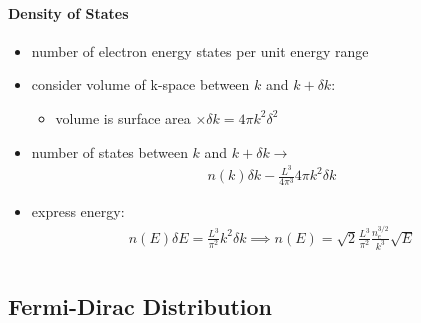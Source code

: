 \documentclass[a4paper,11pt,normalem]{article}
\begin{document}
\paragraph{Density of States}

\begin{itemize}
    \item number of electron energy states per unit energy range
    \item consider volume of k-space between \(k\) and \(k+\delta k\):
        \begin{itemize}
            \item volume is surface area \(\times \delta k = 4\pi k^2\delta^2\)
        \end{itemize}
    \item number of states between \(k\) and \(k+\delta k \to\)
        \begin{align*}
            n(k)\delta k - \frac{L^3}{4\pi^3}4\pi k^2 \delta k
        \end{align*}
    \item express energy:
        \begin{align*}
            n(E)\delta E = \frac{L^3}{\pi^2}k^2\delta k \implies n(E) = \sqrt{2}\frac{L^3}{\pi^2}\frac{n_e^{3/2}}{k^3}\sqrt{E}
        \end{align*}
\end{itemize}

\section{}
\subsection{Fermi-Dirac Distribution}
\end{document}
